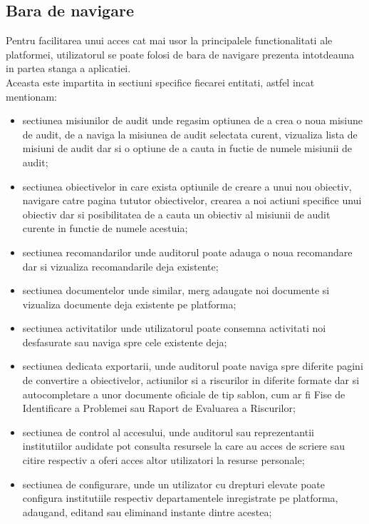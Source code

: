 	\subsection{Bara de navigare}
	Pentru facilitarea unui acces cat mai usor la principalele functionalitati ale platformei, utilizatorul se poate folosi de bara de navigare prezenta intotdeauna in partea stanga a aplicatiei.\\
	Aceasta este impartita in sectiuni specifice fiecarei entitati, astfel incat mentionam:
	\begin{itemize}
		\item  sectiunea misiunilor de audit unde regasim optiunea de a crea o noua misiune de audit, de a naviga la misiunea de audit selectata curent, vizualiza lista de misiuni de audit dar si o optiune de a cauta in fuctie de numele misiunii de audit; 
		
		\item sectiunea obiectivelor in care exista optiunile de creare a unui nou obiectiv, navigare catre pagina tututor obiectivelor, crearea a noi actiuni specifice unui obiectiv dar si posibilitatea de a cauta un obiectiv al misiunii de audit curente in functie de numele acestuia;
		
		\item sectiunea recomandarilor unde auditorul poate adauga o noua recomandare dar si vizualiza recomandarile deja existente;
		
		\item sectiunea documentelor unde similar, merg adaugate noi documente si vizualiza documente deja existente pe platforma;
		
		\item sectiunea activitatilor unde utilizatorul poate consemna activitati noi desfasurate sau naviga spre cele existente deja;
		
		\item sectiunea dedicata exportarii, unde auditorul poate naviga spre diferite pagini de convertire a obiectivelor, actiunilor si a riscurilor in diferite formate dar si autocompletare a unor documente oficiale de tip sablon, cum ar fi Fise de Identificare a Problemei sau Raport de Evaluarea a Riscurilor;
		
		\item sectiunea de control al accesului, unde auditorul sau reprezentantii institutiilor audidate pot consulta resursele la care au acces de scriere sau citire respectiv a oferi acces altor utilizatori la resurse personale;
		
		\item sectiunea de configurare, unde un utilizator cu drepturi elevate poate configura institutiile respectiv departamentele inregistrate pe platforma, adaugand, editand sau eliminand instante dintre acestea;
		
		
	\end{itemize}
	
